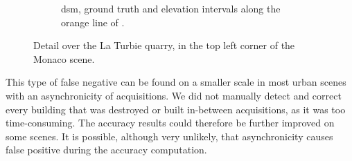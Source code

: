 \begin{figure}
\begin{subfigure}[t]{\linewidth}
        \caption{\acrshort{dsm}, ground truth and elevation intervals along the orange line of .}
        \label{fig:Carriere_row}
    \end{subfigure}
    \caption{Detail over the La Turbie quarry, in the top left corner of the Monaco scene.}
    \label{fig:Carriere}
\end{figure}

This type of false negative can be found on a  smaller scale in most urban scenes with an asynchronicity of acquisitions. We did not manually detect and correct every building that was destroyed or built in-between acquisitions, as it was too time-consuming. The accuracy results could therefore be further improved on some scenes. It is possible, although very unlikely, that asynchronicity causes false positive during the accuracy computation.

